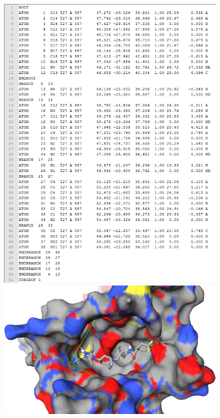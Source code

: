 \documentclass[twocolumn]{svjour3}          %
\begin{document}
\begin{figure}
\includegraphics[width=1.36\textwidth,natwidth=700,natheight=922]{../usrt/T27DockedPDBQT.png}
\endminipage
\\
\centering
\includegraphics[width=1.36\textwidth,natwidth=638,natheight=386]{../usrt/MRV0.png}

\end{figure}
\end{document}
